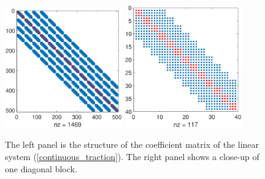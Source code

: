 \begin{figure}[H]
	\centering
	\includegraphics[width=0.45\textwidth,trim={0.6cm 1cm 1cm 1.2cm}, clip]{Mass_matrix.eps}
	\includegraphics[width=0.45\textwidth,trim={0.6cm 1cm 1cm 1.2cm}, clip]{Mass_diagonal_matrix.eps}
	\caption{The left panel is the structure of the coefficient matrix of the linear system (\ref{continuous_traction}).  The right panel shows a close-up of one diagonal block.}\label{Mass_matrix}
\end{figure}
